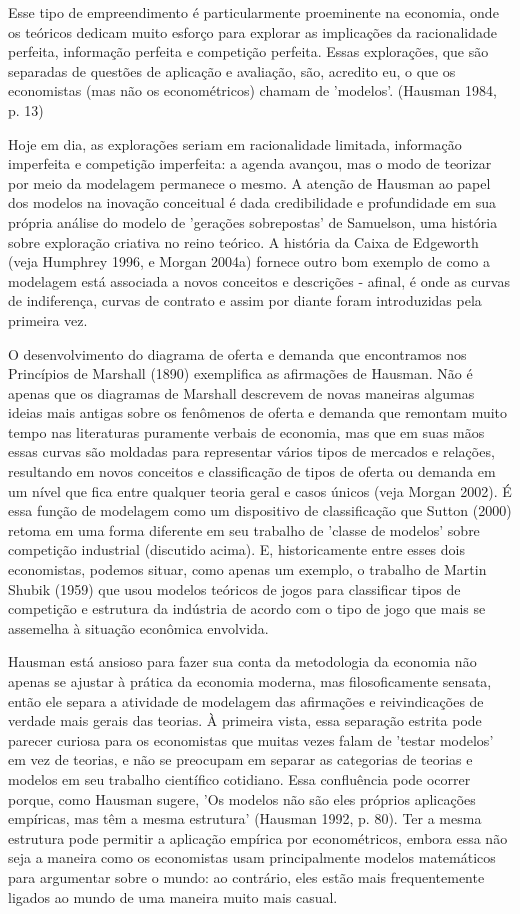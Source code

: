 \documentclass[12pt]{article}
\begin{document}
Esse tipo de empreendimento é particularmente proeminente na economia, onde os teóricos dedicam muito esforço para explorar as implicações da racionalidade perfeita, informação perfeita e competição perfeita. Essas explorações, que são separadas de questões de aplicação e avaliação, são, acredito eu, o que os economistas (mas não os econométricos) chamam de 'modelos'. (Hausman 1984, p. 13)

Hoje em dia, as explorações seriam em racionalidade limitada, informação imperfeita e competição imperfeita: a agenda avançou, mas o modo de teorizar por meio da modelagem permanece o mesmo. A atenção de Hausman ao papel dos modelos na inovação conceitual é dada credibilidade e profundidade em sua própria análise do modelo de 'gerações sobrepostas' de Samuelson, uma história sobre exploração criativa no reino teórico. A história da Caixa de Edgeworth (veja Humphrey 1996, e Morgan 2004a) fornece outro bom exemplo de como a modelagem está associada a novos conceitos e descrições - afinal, é onde as curvas de indiferença, curvas de contrato e assim por diante foram introduzidas pela primeira vez.

O desenvolvimento do diagrama de oferta e demanda que encontramos nos Princípios de Marshall (1890) exemplifica as afirmações de Hausman. Não é apenas que os diagramas de Marshall descrevem de novas maneiras algumas ideias mais antigas sobre os fenômenos de oferta e demanda que remontam muito tempo nas literaturas puramente verbais de economia, mas que em suas mãos essas curvas são moldadas para representar vários tipos de mercados e relações, resultando em novos conceitos e classificação de tipos de oferta ou demanda em um nível que fica entre qualquer teoria geral e casos únicos (veja Morgan 2002). É essa função de modelagem como um dispositivo de classificação que Sutton (2000) retoma em uma forma diferente em seu trabalho de 'classe de modelos' sobre competição industrial (discutido acima). E, historicamente entre esses dois economistas, podemos situar, como apenas um exemplo, o trabalho de Martin Shubik (1959) que usou modelos teóricos de jogos para classificar tipos de competição e estrutura da indústria de acordo com o tipo de jogo que mais se assemelha à situação econômica envolvida.

Hausman está ansioso para fazer sua conta da metodologia da economia não apenas se ajustar à prática da economia moderna, mas filosoficamente sensata, então ele separa a atividade de modelagem das afirmações e reivindicações de verdade mais gerais das teorias. À primeira vista, essa separação estrita pode parecer curiosa para os economistas que muitas vezes falam de 'testar modelos' em vez de teorias, e não se preocupam em separar as categorias de teorias e modelos em seu trabalho científico cotidiano. Essa confluência pode ocorrer porque, como Hausman sugere, 'Os modelos não são eles próprios aplicações empíricas, mas têm a mesma estrutura' (Hausman 1992, p. 80). Ter a mesma estrutura pode permitir a aplicação empírica por econométricos, embora essa não seja a maneira como os economistas usam principalmente modelos matemáticos para argumentar sobre o mundo: ao contrário, eles estão mais frequentemente ligados ao mundo de uma maneira muito mais casual.
\end{document}
